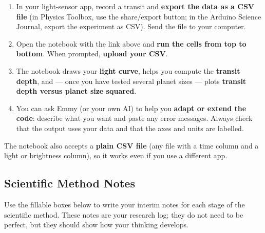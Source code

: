 \documentclass[12pt]{article}
\begin{document}
\begin{enumerate}
  \item In your light-sensor app, record a transit and \textbf{export the data as a CSV file} (in Physics Toolbox, use the share/export button; in the Arduino Science Journal, export the experiment as CSV). Send the file to your computer.
  \item Open the notebook with the link above and \textbf{run the cells from top to bottom}. When prompted, \textbf{upload your CSV}.
  \item The notebook draws your \textbf{light curve}, helps you compute the \textbf{transit depth}, and --- once you have tested several planet sizes --- plots \textbf{transit depth versus planet size squared}.
  \item You can ask Emmy (or your own AI) to help you \textbf{adapt or extend the code}: describe what you want and paste any error messages. Always check that the output uses your data and that the axes and units are labelled.
\end{enumerate}

The notebook also accepts a \textbf{plain CSV file} (any file with a time column and a light or brightness column), so it works even if you use a different app.


\subsection*{Scientific Method Notes}

Use the fillable boxes below to write your interim notes for each stage of the scientific method. These notes are your research log; they do not need to be perfect, but they should show how your thinking develops.
\end{document}
